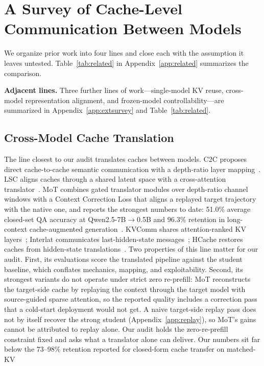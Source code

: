 \documentclass{article} %
\begin{document}
\section{A Survey of Cache-Level Communication Between Models}
\label{sec:survey}

We organize prior work into four lines and close each with the assumption it
leaves untested. Table~\ref{tab:related} in Appendix~\ref{app:related}
summarizes the comparison.

\textbf{Adjacent lines.} Three further lines of work---single-model KV reuse,
cross-model representation alignment, and frozen-model controllability---are
summarized in Appendix~\ref{app:extsurvey} and Table~\ref{tab:related}.

\subsection{Cross-Model Cache Translation}
The line closest to our audit translates caches between models. C2C proposes
direct cache-to-cache semantic communication with a depth-ratio layer
mapping~\citep{c2c2025}. LSC aligns caches through a shared latent space with
a cross-attention translator~\citep{lsc2026}. MoT combines gated translator
modules over depth-ratio channel windows with a Context Correction Loss that
aligns a replayed target trajectory with the native one, and reports the
strongest numbers to date: 51.0\% average closed-set QA accuracy at
Qwen2.5-7B$\to$0.5B and 96.3\% retention in long-context cache-augmented
generation~\citep{mot2026}. KVComm shares attention-ranked KV
layers~\citep{kvcomm2025}; Interlat communicates last-hidden-state
messages~\citep{interlat2025}; HCache restores caches from hidden-state
translations~\citep{hcache2025}. Two properties of this line matter for our
audit. First, its evaluations score the translated pipeline against the
student baseline, which conflates mechanics, mapping, and exploitability.
Second, its strongest variants do not operate under strict zero re-prefill:
MoT reconstructs the target-side cache by replaying the context through the
target model with source-guided sparse attention, so the reported quality
includes a correction pass that a cold-start deployment would not get. A naive
target-side replay pass does not by itself recover the strong student
(Appendix~\ref{app:replay}), so MoT's gains cannot be attributed to replay
alone. Our audit holds the zero-re-prefill constraint fixed and asks what a
translator alone can deliver. Our numbers sit far below the 73--98\% retention
reported for closed-form cache transfer on matched-KV
\end{document}
